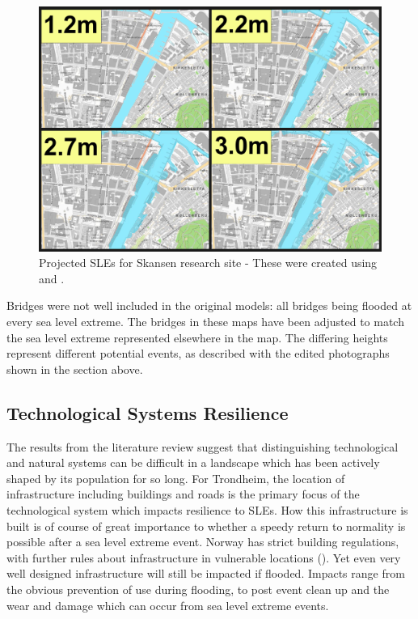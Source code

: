 \begin{figure}[H]
    \centering
    \includegraphics[width=16cm]{fig_sle/nidelva-sle-num.png}
    \caption{Projected SLEs for Skansen research site - These were created using \cite{kartverket_se_2021} and \cite{stormflo_database_stormflo_2021}. }
    \label{fig:sle-nidelva-num}
\end{figure}

 Bridges were not well included in the original models: all bridges being flooded at every sea level extreme. The bridges in these maps have been adjusted to match the sea level extreme represented elsewhere in the map. The differing heights represent different potential events,  as described with the edited photographs shown in the section above. 

\subsection{Technological Systems Resilience}
The results from the literature review suggest that distinguishing technological and natural systems can be difficult in a landscape which has been actively shaped by its population for so long. For Trondheim, the location of infrastructure including buildings and roads is the primary focus of the technological system which impacts resilience to SLEs. How this infrastructure is built is of course of great importance to whether a speedy return to normality is possible after a sea level extreme event. Norway has strict building regulations, with further rules about infrastructure in vulnerable locations (\cite{direktoratet_for_byggkvalitet_direktoratet_nodate}). Yet even very well designed infrastructure will still be impacted if flooded. Impacts range from the obvious  prevention of use during flooding, to post event clean up and the wear and damage which can occur from sea level extreme events.
